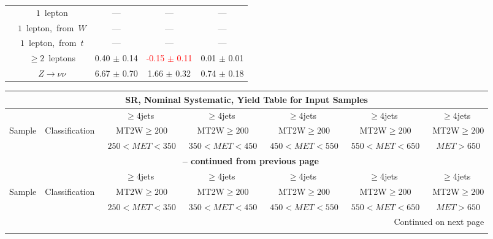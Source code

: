 \documentclass{article}
\begin{document}
\begin{longtable}{|l|c|c|c|c|}
 & $1$~lepton  & ---  & ---  & --- \\* 
 & $1$~lepton,~from~$W$  & ---  & ---  & --- \\* 
 & $1$~lepton,~from~$t$  & ---  & ---  & --- \\* 
 & $\ge2$~leptons  & 0.40 $\pm$ 0.14  & \textcolor{red}{ -0.15 $\pm$ 0.11 }  & 0.01 $\pm$ 0.01 \\* 
 & $Z\rightarrow\nu\nu$  & 6.67 $\pm$ 0.70  & 1.66 $\pm$ 0.32  & 0.74 $\pm$ 0.18 \\* 
\hline 
\end{longtable} 

 
 
 
 
\pagebreak 

 
 
 
 
\begin{longtable}{|l|c|c|c|c|c|c|} 
 
\multicolumn{7}{c}{ SR, Nominal Systematic, Yield Table for Input Samples }\\* \hline 
 &  & $\ge$4jets  & $\ge$4jets  & $\ge$4jets  & $\ge$4jets  & $\ge$4jets \\* 
Sample & Classification  & ~MT2W$\ge200$  & ~MT2W$\ge200$  & ~MT2W$\ge200$  & ~MT2W$\ge200$  & ~MT2W$\ge200$ \\* 
 &  & ~$250<MET<350$  & ~$350<MET<450$  & ~$450<MET<550$  & ~$550<MET<650$  & ~$MET>650$ \\* 
\hline \hline 
\endfirsthead 
 
\multicolumn{7}{c}{{\bfseries \tablename\ \thetable{} -- continued from previous page}}\\* \hline 
 &  & $\ge$4jets  & $\ge$4jets  & $\ge$4jets  & $\ge$4jets  & $\ge$4jets \\* 
Sample & Classification  & ~MT2W$\ge200$  & ~MT2W$\ge200$  & ~MT2W$\ge200$  & ~MT2W$\ge200$  & ~MT2W$\ge200$ \\* 
 &  & ~$250<MET<350$  & ~$350<MET<450$  & ~$450<MET<550$  & ~$550<MET<650$  & ~$MET>650$ \\* 
\hline \hline 
\endhead 
 
\multicolumn{7}{|r|}{{Continued on next page}}\\* \hline 
\endfoot 
 
 
\endlastfoot 
 

\end{longtable}
\end{document}
